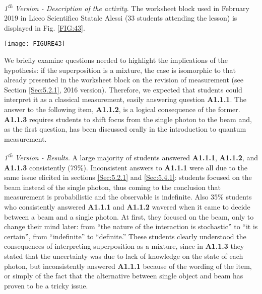 \documentclass[twocolumn,secnumarabic,amssymb, nobibnotes, aps, prd, nofootinbib]{revtex4-2}
\begin{document}
\emph{1\textsuperscript{th} Version - Description of the activity}. The worksheet block used in February 2019 in Liceo Scientifico Statale Alessi (33 students attending the lesson) is displayed in Fig. \ref{FIG:43}.
\begin{figure*}[!htpb]
       \texttt{[image: FIGURE43]}
    \caption{Worksheet block on the interpretation of quantum superposition: Liceo Alessi, 2019.}
    \label{FIG:43}
\end{figure*}
We briefly examine questions needed to highlight the implications of the hypothesis: if the superposition is a mixture, the case is isomorphic to that already presented in the worksheet block on the revision of measurement (see Section \ref{Sec:5.2.1}, 2016 version). Therefore, we expected that students could interpret it as a classical measurement, easily answering question \textbf{A1.1.1}. The answer to the following item, \textbf{A1.1.2}, is a logical consequence of the former. \textbf{A1.1.3} requires students to shift focus from the single photon to the beam and, as the first question, has been discussed orally in the introduction to quantum measurement.

\emph{1\textsuperscript{th} Version - Results}. A large majority of students answered \textbf{A1.1.1}, \textbf{A1.1.2}, and \textbf{A1.1.3} consistently (79\%). Inconsistent answers to \textbf{A1.1.1} were all due to the same issue elicited in sections \ref{Sec:5.2.1} and \ref{Sec:5.4.1}: students focused on the beam instead of the single photon, thus coming to the conclusion that measurement is probabilistic and the observable is indefinite. Also 35\% students who consistently answered \textbf{A1.1.1} and \textbf{A1.1.2} wavered when it came to decide between a beam and a single photon. At first, they focused on the beam, only to change their mind later: from ``the nature of the interaction is stochastic'' to ``it is certain'', from ``indefinite'' to ``definite.'' These students clearly understood the consequences of interpreting superposition as a mixture, since in \textbf{A1.1.3} they stated that the uncertainty was due to lack of knowledge on the state of each photon, but  inconsistently answered \textbf{A1.1.1} because of the wording of the item, or simply of the fact that the alternative between single object and beam has proven to be a tricky issue.
\end{document}
